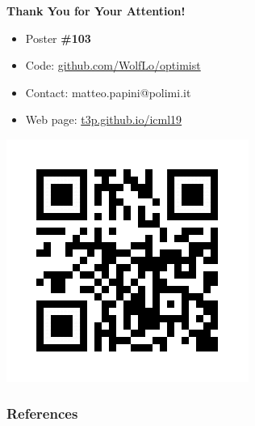 \documentclass[aspectratio=169, table]{beamer}
\newcommand{\enb}[1]{\textcolor{poliblue1}{\textbf{#1}}}
\begin{document}
\begin{frame}[plain]
\begin{center}
	\huge{\enb{Thank You for Your Attention!}}
\end{center}

\begin{minipage}[]{.5\paperwidth}
	\begin{itemize}
		\item[] Poster \textbf{\#103}
		\item[] Code: \url{github.com/WolfLo/optimist}
		\item[] Contact: matteo.papini@polimi.it
		\item[] Web page: \url{t3p.github.io/icml19} 
	\end{itemize}
\end{minipage}
\hspace{2cm}%
\begin{minipage}[]{.2\paperwidth}
	\includegraphics[width=\textwidth]{qr.png}
\end{minipage}
\end{frame}


\begin{frame}
\frametitle{References}


\end{frame}

\end{document}
